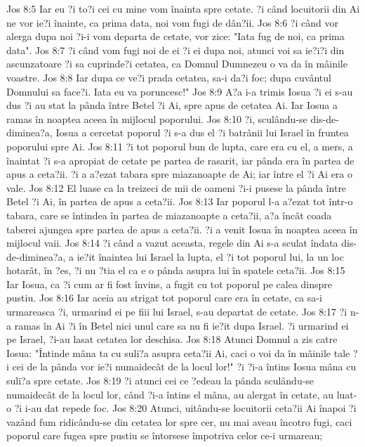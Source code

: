 Jos 8:5  Iar eu ?i to?i cei cu mine vom înainta spre cetate. ?i când locuitorii din Ai ne vor ie?i înainte, ca prima data, noi vom fugi de dân?ii.
Jos 8:6  ?i când vor alerga dupa noi ?i-i vom departa de cetate, vor zice: "Iata fug de noi, ca prima data".
Jos 8:7  ?i când vom fugi noi de ei ?i ei dupa noi, atunci voi sa ie?i?i din ascunzatoare ?i sa cuprinde?i cetatea, ca Domnul Dumnezeu o va da în mâinile voastre.
Jos 8:8  Iar dupa ce ve?i prada cetatea, sa-i da?i foc; dupa cuvântul Domnului sa face?i. Iata eu va poruncesc!"
Jos 8:9  A?a i-a trimis Iosua ?i ei s-au dus ?i au stat la pânda între Betel ?i Ai, spre apus de cetatea Ai. Iar Iosua a ramas în noaptea aceea în mijlocul poporului.
Jos 8:10  ?i, sculându-se dis-de-diminea?a, Iosua a cercetat poporul ?i s-a dus el ?i batrânii lui Israel în fruntea poporului spre Ai.
Jos 8:11  ?i tot poporul bun de lupta, care era cu el, a mers, a înaintat ?i s-a apropiat de cetate pe partea de rasarit, iar pânda era în partea de apus a ceta?ii. ?i a a?ezat tabara spre miazanoapte de Ai; iar între el ?i Ai era o vale.
Jos 8:12  El luase ca la treizeci de mii de oameni ?i-i pusese la pânda între Betel ?i Ai, în partea de apus a ceta?ii.
Jos 8:13  Iar poporul l-a a?ezat tot într-o tabara, care se întindea în partea de miazanoapte a ceta?ii, a?a încât coada taberei ajungea spre partea de apus a ceta?ii. ?i a venit Iosua în noaptea aceea în mijlocul vaii.
Jos 8:14  ?i când a vazut aceasta, regele din Ai s-a sculat îndata dis-de-diminea?a, a ie?it înaintea lui Israel la lupta, el ?i tot poporul lui, la un loc hotarât, în ?es, ?i nu ?tia el ca e o pânda asupra lui în spatele ceta?ii.
Jos 8:15  Iar Iosua, ca ?i cum ar fi fost învins, a fugit cu tot poporul pe calea dinspre pustiu.
Jos 8:16  Iar aceia au strigat tot poporul care era în cetate, ca sa-i urmareasca ?i, urmarind ei pe fiii lui Israel, s-au departat de cetate.
Jos 8:17  ?i n-a ramas în Ai ?i în Betel nici unul care sa nu fi ie?it dupa Israel. ?i urmarind ei pe Israel, ?i-au lasat cetatea lor deschisa.
Jos 8:18  Atunci Domnul a zis catre Iosua: "Întinde mâna ta cu suli?a asupra ceta?ii Ai, caci o voi da în mâinile tale ?i cei de la pânda vor ie?i numaidecât de la locul lor!" ?i ?i-a întins Iosua mâna cu suli?a spre cetate.
Jos 8:19  ?i atunci cei ce ?edeau la pânda sculându-se numaidecât de la locul lor, când ?i-a întins el mâna, au alergat în cetate, au luat-o ?i i-au dat repede foc.
Jos 8:20  Atunci, uitându-se locuitorii ceta?ii Ai înapoi ?i vazând fum ridicându-se din cetatea lor spre cer, nu mai aveau încotro fugi, caci poporul care fugea spre pustiu se întorsese împotriva celor ce-i urmareau;
